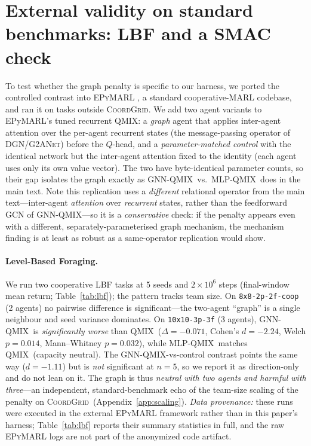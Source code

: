 \documentclass[10pt]{article}
\newcommand{\algoname}[1]{\textsc{#1}}
\newcommand{\qmix}{\algoname{QMIX}}
\newcommand{\gnnqmix}{\algoname{GNN-QMIX}}
\newcommand{\coordgrid}{\textsc{CoordGrid}}
\newcommand{\mlpqmix}{\algoname{MLP-QMIX}}
\begin{document}
\section{External validity on standard benchmarks: LBF and a SMAC check}
\label{app:standard}

To test whether the graph penalty is specific to our harness, we ported the
controlled contrast into \textsc{EPyMARL} \citep{papoudakis_2021_benchmarking},
a standard cooperative-MARL codebase, and ran it on tasks outside \coordgrid.
We add two agent variants to EPyMARL's tuned recurrent \qmix: a \emph{graph}
agent that applies inter-agent attention over the per-agent recurrent states
(the message-passing operator of \algoname{DGN}/\algoname{G2ANet}) before the
$Q$-head, and a \emph{parameter-matched control} with the identical network but
the inter-agent attention fixed to the identity (each agent uses only its own
value vector). The two have byte-identical parameter counts, so their gap
isolates the graph exactly as \gnnqmix\ vs.\ \mlpqmix\ does in the main text.
Note this replication uses a \emph{different} relational operator from the
main text---inter-agent \emph{attention} over \emph{recurrent} states, rather
than the feedforward GCN of \gnnqmix---so it is a \emph{conservative} check:
if the penalty appears even with a different, separately-parameterised graph
mechanism, the mechanism finding is at least as robust as a same-operator
replication would show.

\paragraph{Level-Based Foraging.} We run two cooperative LBF tasks
\citep{papoudakis_2021_benchmarking} at 5 seeds and $2\times10^6$ steps
(final-window mean return; Table~\ref{tab:lbf}); the pattern tracks team
size. On \texttt{8x8-2p-2f-coop} (2 agents) no pairwise difference is
significant---the two-agent ``graph'' is a single neighbour and seed
variance dominates. On \texttt{10x10-3p-3f} (3 agents), \gnnqmix\ is
\emph{significantly worse} than \qmix\ ($\Delta=-0.071$, Cohen's $d=-2.24$,
Welch $p=0.014$, Mann--Whitney $p=0.032$), while \mlpqmix\ matches \qmix\
(capacity neutral). The \gnnqmix-vs-control contrast points the same way
($d=-1.11$) but is \emph{not} significant at $n{=}5$, so we report it as
direction-only and do not lean on it. The graph
is thus \emph{neutral with two agents and harmful with three}---an
independent, standard-benchmark echo of the team-size scaling of the penalty
on \coordgrid\ (Appendix~\ref{app:scaling}). \emph{Data provenance:} these
runs were executed in the external \textsc{EPyMARL} framework rather than in
this paper's harness; Table~\ref{tab:lbf} reports their summary statistics
in full, and the raw \textsc{EPyMARL} logs are not part of the anonymized
code artifact.
\end{document}
